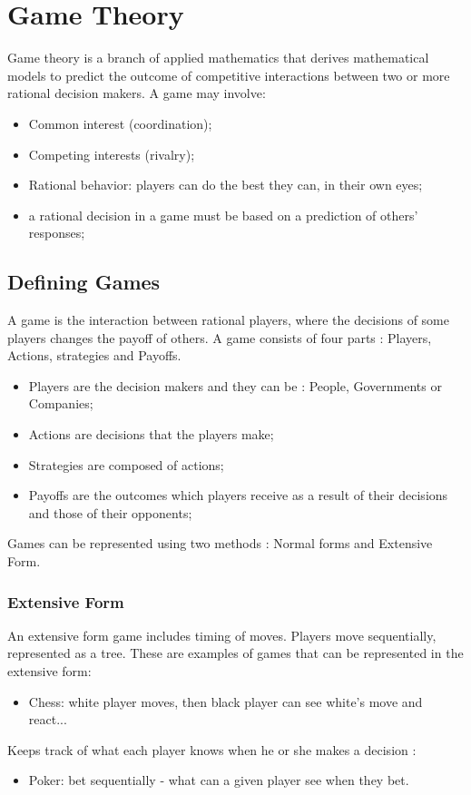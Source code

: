 \section{Game Theory}
Game theory is a branch of applied mathematics that derives mathematical models to predict the outcome of competitive interactions between two or more rational decision makers. A game may involve: 
\begin{itemize}
\item Common interest (coordination);
\item Competing interests (rivalry);
\item Rational behavior: players can do the best they can, in their own eyes;
\item a rational decision in a game must be based on a prediction of others' responses;
\end{itemize}
\clearpage
 

\subsection{Defining Games} 
A game is the interaction between rational players, where the decisions of some players changes the payoff of others. A game consists of four parts : 
Players, Actions, strategies and Payoffs.
\begin{itemize}
\item Players are the decision makers and they can be : People, Governments or Companies;
\item Actions are decisions that the players make;
\item Strategies are composed of actions;
\item Payoffs are the outcomes which players receive as a result of their decisions and those of their opponents;
\end{itemize}
Games can be represented using two methods : Normal forms and Extensive Form.
\subsubsection{Extensive Form}
An extensive form game includes timing of moves. 
Players move sequentially, represented as a tree. These are examples of games that can be represented in the extensive form: 
\begin{itemize}
\item Chess: white player moves, then black player can see white's move and react...
\end{itemize}
Keeps track of what each player knows when he or she makes a decision :
\begin{itemize}
\item Poker: bet sequentially - what can a given player see when they bet. 
\end{itemize}

